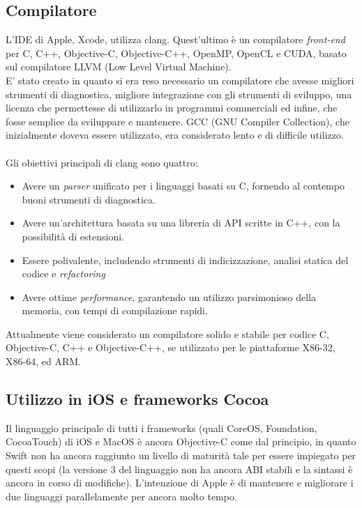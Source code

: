 \subsection{Compilatore}
L'IDE di Apple, Xcode, utilizza clang. Quest'ultimo è un compilatore \textit{front-end} per C, C++, Objective-C, Objective-C++, OpenMP, OpenCL e CUDA, basato sul compilatore LLVM (Low Level Virtual Machine).\\E' stato creato in quanto si era reso necessario un compilatore che avesse migliori strumenti di diagnostica, migliore integrazione con gli strumenti di sviluppo, una licenza che permettesse di utilizzarlo in programmi commerciali ed infine, che fosse semplice da sviluppare e mantenere. GCC (GNU Compiler Collection), che inizialmente doveva essere utilizzato, era considerato lento e di difficile utilizzo.\\\\Gli obiettivi principali di clang sono quattro:
\begin{itemize} 
\item Avere un \textit{parser} unificato per i linguaggi basati su C, fornendo al contempo buoni strumenti di diagnostica.
\item Avere un'architettura basata su una libreria di API scritte in C++, con la possibilità di estensioni.
\item Essere polivalente, includendo strumenti di indicizzazione, analisi statica del codice e \textit{refactoring}
\item Avere ottime \textit{performance}, garantendo un utilizzo parsimonioso della memoria, con tempi di compilazione rapidi.
\end{itemize}
Attualmente viene considerato un compilatore solido e stabile per codice C, Objective-C, C++ e Objective-C++, se utilizzato per le piattaforme X86-32, X86-64, ed ARM.  
\subsection{Utilizzo in iOS e frameworks Cocoa}
Il linguaggio principale di tutti i frameworks (quali CoreOS, Foundation, CocoaTouch) di iOS e MacOS è ancora Objective-C come dal principio, in quanto Swift non ha ancora raggiunto un livello di maturità tale per essere impiegato per questi scopi (la versione 3 del linguaggio non ha ancora ABI stabili e la sintassi è ancora in corso di modifiche). L'intenzione di Apple è di mantenere e migliorare i due linguaggi parallelamente per ancora molto tempo.